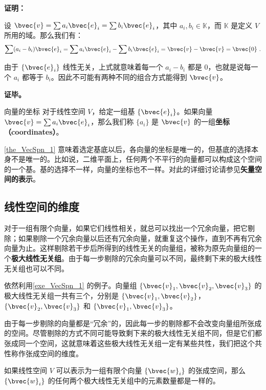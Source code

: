 \textbf{证明：}

设 $\bvec{v}=\sum a_i\bvec{e}_i=\sum b_i\bvec{e}_i$，其中 $a_i, b_i\in \mathbb{K}$，而 $\mathbb{K}$ 是定义 $V$ 所用的域。那么我们有：
\begin{equation}
\sum(a_i-b_i)\bvec{e}_i=\sum a_i\bvec{e}_i-\sum b_i\bvec{e}_i=\bvec{v}-\bvec{v}=\bvec{0}~.
\end{equation}

由于 $\{\bvec{e}_i\}$ 线性无关，上式就意味着每一个 $a_i-b_i$ 都是 $0$，也就是说每一个 $a_i$ 都等于 $b_i$。因此不可能有两种不同的组合方式能得到 $\bvec{v}$。

\textbf{证毕。}

\begin{definition}{向量的坐标}
对于线性空间 $V$，给定一组基 $\{\bvec{e}_i\}$。如果向量 $\bvec{v}=\sum a_i\bvec{e}_i$，那么我们称 $\{a_i\}$ 是 $\bvec{v}$ 的一组\textbf{坐标（coordinates）}。
\end{definition}

\autoref{the_VecSpn_1} 意味着选定基底以后，各向量的坐标是唯一的，但基底的选择本身不是唯一的。比如说，二维平面上，任何两个不平行的向量都可以构成这个空间的一个基。基的选择不一样，向量的坐标也不一样。对此的详细讨论请参见\textbf{矢量空间的表示}。

\subsection{线性空间的维度}

对于一组有限个向量，如果它们线性相关，就总可以找出一个冗余向量，把它剔除；如果剔除一个冗余向量以后还有冗余向量，就重复这个操作，直到不再有冗余向量为止。这样剔除若干步后所得到的线性无关的向量组，被称为原先向量组的一个\textbf{极大线性无关组}。由于每一步剔除的冗余向量可以不同，最终剩下来的极大线性无关组也可以不同。

\begin{example}{}
依然利用\autoref{exe_VecSpn_1} 的例子。向量组 $\{\bvec{v}_1, \bvec{v}_2, \bvec{v}_3\}$ 的极大线性无关组一共有三个，分别是 $\{\bvec{v}_1, \bvec{v}_2\}$，$\{\bvec{v}_2, \bvec{v}_3\}$ 和 $\{\bvec{v}_1, \bvec{v}_3\}$。
\end{example}

由于每一步剔除的向量都是“冗余”的，因此每一步的剔除都不会改变向量组所张成的空间。尽管剔除的方式不同可能导致剩下来的极大线性无关组不同，但是它们都张成同一个空间，这就意味着这些极大线性无关组一定有某些共性，我们把这个共性称作张成空间的维度。

\begin{theorem}{}\label{the_VecSpn_2}
如果线性空间 $V$ 可以表示为一组有限个向量 $\{\bvec{w}_i\}$ 的张成空间，那么 $\{\bvec{w}_i\}$ 的任何两个极大线性无关组中的元素数量都是一样的。
\end{theorem}

